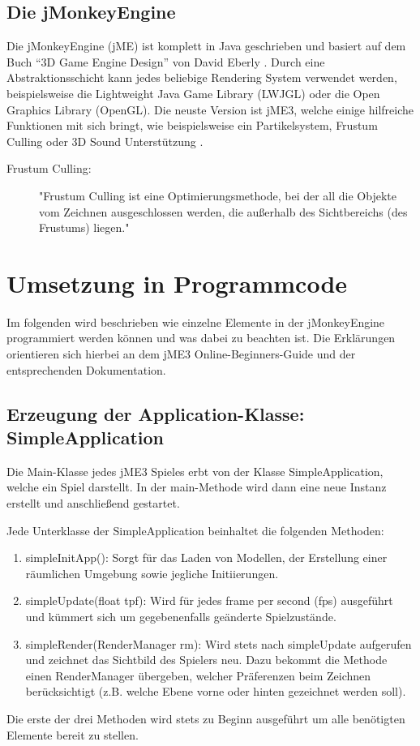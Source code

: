 \subsection {Die jMonkeyEngine}
Die jMonkeyEngine (jME) ist komplett in Java geschrieben und basiert auf dem Buch \enquote{3D Game Engine Design} von David Eberly \cite{GE2}.
Durch eine Abstraktionsschicht kann jedes beliebige Rendering System verwendet werden, beispielsweise die Lightweight Java Game Library (LWJGL) oder die Open Graphics Library (OpenGL).
Die neuste Version ist jME3, welche einige hilfreiche Funktionen mit sich bringt, wie beispielsweise ein Partikelsystem, Frustum Culling oder 3D Sound Unterstützung \cite{JM1}.
\begin{description}
	\item[Frustum Culling:] "Frustum Culling ist eine Optimierungsmethode, bei der all die Objekte vom Zeichnen ausgeschlossen werden, die außerhalb des Sichtbereichs (des Frustums) liegen." \cite{FC1}
\end{description}


\section{Umsetzung in Programmcode}\label{sec:code}
Im folgenden wird beschrieben wie einzelne Elemente in der jMonkeyEngine programmiert werden können und was dabei zu beachten ist. Die Erklärungen orientieren sich hierbei an dem jME3 Online-Beginners-Guide \cite{BG1} und der entsprechenden Dokumentation.

\subsection{Erzeugung der Application-Klasse: SimpleApplication}
Die Main-Klasse jedes jME3 Spieles erbt von der Klasse SimpleApplication, welche ein Spiel darstellt.
In der main-Methode wird dann eine neue Instanz erstellt und anschließend gestartet.

Jede Unterklasse der SimpleApplication beinhaltet die folgenden Methoden:
\begin{enumerate}
	\item simpleInitApp():
	Sorgt für das Laden von Modellen, der Erstellung einer räumlichen Umgebung sowie jegliche Initiierungen.
	\item simpleUpdate(float tpf):
	Wird für jedes frame per second (fps) ausgeführt und kümmert sich um gegebenenfalls geänderte Spielzustände.
	\item simpleRender(RenderManager rm):
	Wird stets nach simpleUpdate aufgerufen und zeichnet das Sichtbild des Spielers neu. Dazu bekommt die Methode einen RenderManager übergeben, welcher Präferenzen beim Zeichnen berücksichtigt (z.B. welche Ebene vorne oder hinten gezeichnet werden soll).
\end{enumerate} Die erste der drei Methoden wird stets zu Beginn ausgeführt um alle benötigten Elemente bereit zu stellen.

